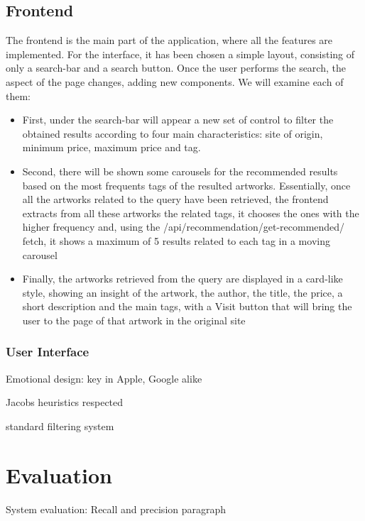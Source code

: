 \documentclass[12pt]{spieman}  %
\begin{document}
\begin{spacing}{1}
    \subsection{Frontend}
    The frontend is the main part of the application, where all the features are implemented.\newline
    For the interface, it has been chosen a simple layout, consisting of only a search-bar and a search button. Once the user performs the search, the aspect of the page changes, adding new components. We will examine each of them:
    \begin{itemize}
        \item First, under the search-bar will appear a new set of control to filter the obtained results according to four main characteristics: site of origin, minimum price, maximum price and tag.
        \item Second, there will be shown some carousels for the recommended results based on the most frequents tags of the resulted artworks. Essentially, once all the artworks related to the query have been retrieved, the frontend extracts from all these artworks the related tags, it chooses the ones with the higher frequency and, using the /api/recommendation/get-recommended/ fetch, it shows a maximum of 5 results related to each tag in a moving carousel
        \item Finally, the artworks retrieved from the query are displayed in a card-like style, showing an insight of the artwork, the author, the title, the price, a short description and the main tags, with a Visit button that will bring the user to the page of that artwork in the original site
    \end{itemize}

    \subsubsection{User Interface}\label{sec:ui}

    Emotional design: key in Apple, Google alike

    Jacobs heuristics respected

    standard filtering system


    \section{Evaluation}
    System evaluation: Recall and precision paragraph


\end{spacing}
\end{document}
